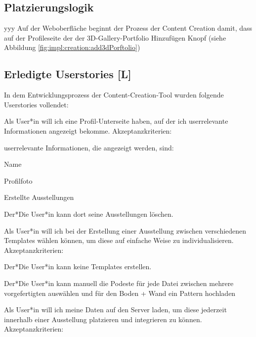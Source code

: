 \subsection{Platzierungslogik}


yyy Auf der Weboberfläche beginnt der Prozess der Content Creation damit, dass auf der Profileseite der der 3D-Gallery-Portfolio Hinzufügen Knopf (siehe Abbildung \ref{fig:impl:creation:add3dPorftolio})




\subsection{Erledigte Userstories [L]}
In dem Entwicklungsprozess der Content-Creation-Tool wurden folgende Userstories vollendet:
\begin{compactenum}
    \item  Als User*in will ich eine Profil-Unterseite haben, auf der ich userrelevante Informationen angezeigt bekomme. Akzeptanzkriterien:
    \begin{compactitem}
        \item userrelevante Informationen, die angezeigt werden, sind:
        \begin{compactitem}
            \item Name
            \item Profilfoto
            \item Erstellte Ausstellungen        
        \end{compactitem}
        \item Der*Die User*in kann dort seine Ausstellungen löschen.        
    \end{compactitem}
    \item Als User*in will ich bei der Erstellung einer Ausstellung zwischen verschiedenen Templates wählen können, um diese auf einfache Weise zu individualisieren. Akzeptanzkriterien:
    \begin{compactitem}
        \item Der*Die User*in kann keine Templates erstellen.
        \item Der*Die User*in kann manuell die Podeste für jede Datei zwischen mehrere vorgefertigten auswählen und für den Boden + Wand ein Pattern hochladen
    \end{compactitem}
    \item Als User*in will ich meine Daten auf den Server laden, um diese jederzeit innerhalb einer Ausstellung platzieren und integrieren zu können. Akzeptanzkriterien:

\end{compactenum}
